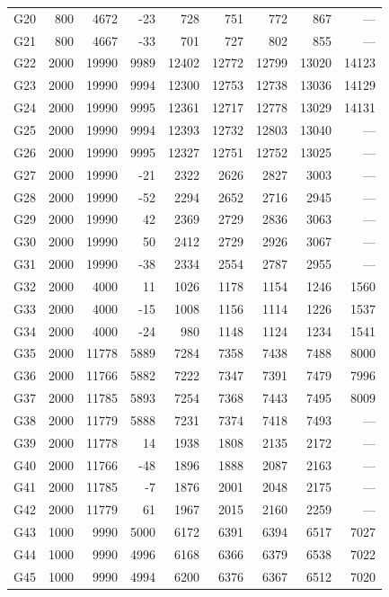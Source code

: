 \documentclass[12pt,a4paper]{article}
\begin{document}
\begin{longtable}{lrrrrrrrr}
G20 & 800 & 4672 & -23 & 728 & 751 & 772 & 867 & --- \\
G21 & 800 & 4667 & -33 & 701 & 727 & 802 & 855 & --- \\
G22 & 2000 & 19990 & 9989 & 12402 & 12772 & 12799 & 13020 & 14123 \\
G23 & 2000 & 19990 & 9994 & 12300 & 12753 & 12738 & 13036 & 14129 \\
G24 & 2000 & 19990 & 9995 & 12361 & 12717 & 12778 & 13029 & 14131 \\
G25 & 2000 & 19990 & 9994 & 12393 & 12732 & 12803 & 13040 & --- \\
G26 & 2000 & 19990 & 9995 & 12327 & 12751 & 12752 & 13025 & --- \\
G27 & 2000 & 19990 & -21 & 2322 & 2626 & 2827 & 3003 & --- \\
G28 & 2000 & 19990 & -52 & 2294 & 2652 & 2716 & 2945 & --- \\
G29 & 2000 & 19990 & 42 & 2369 & 2729 & 2836 & 3063 & --- \\
G30 & 2000 & 19990 & 50 & 2412 & 2729 & 2926 & 3067 & --- \\
G31 & 2000 & 19990 & -38 & 2334 & 2554 & 2787 & 2955 & --- \\
G32 & 2000 & 4000 & 11 & 1026 & 1178 & 1154 & 1246 & 1560 \\
G33 & 2000 & 4000 & -15 & 1008 & 1156 & 1114 & 1226 & 1537 \\
G34 & 2000 & 4000 & -24 & 980 & 1148 & 1124 & 1234 & 1541 \\
G35 & 2000 & 11778 & 5889 & 7284 & 7358 & 7438 & 7488 & 8000 \\
G36 & 2000 & 11766 & 5882 & 7222 & 7347 & 7391 & 7479 & 7996 \\
G37 & 2000 & 11785 & 5893 & 7254 & 7368 & 7443 & 7495 & 8009 \\
G38 & 2000 & 11779 & 5888 & 7231 & 7374 & 7418 & 7493 & --- \\
G39 & 2000 & 11778 & 14 & 1938 & 1808 & 2135 & 2172 & --- \\
G40 & 2000 & 11766 & -48 & 1896 & 1888 & 2087 & 2163 & --- \\
G41 & 2000 & 11785 & -7 & 1876 & 2001 & 2048 & 2175 & --- \\
G42 & 2000 & 11779 & 61 & 1967 & 2015 & 2160 & 2259 & --- \\
G43 & 1000 & 9990 & 5000 & 6172 & 6391 & 6394 & 6517 & 7027 \\
G44 & 1000 & 9990 & 4996 & 6168 & 6366 & 6379 & 6538 & 7022 \\
G45 & 1000 & 9990 & 4994 & 6200 & 6376 & 6367 & 6512 & 7020 \\

\end{longtable}
\end{document}
